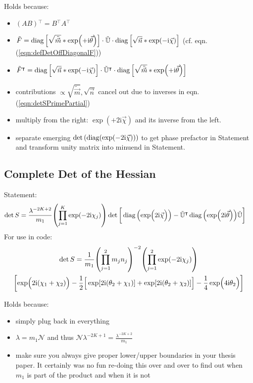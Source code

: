 \documentclass[
	english,
	a4paper,
	fontsize=10pt,
	parskip=half,
	titlepage=true,
	DIV=12,
	final
]{scrreprt}
\newcommand*{\transp}{\ensuremath{^\intercal}}
\newcommand*{\iunit}{\ensuremath{\mathrm{i}}}
\DeclareMathOperator{\diag}{diag}
\begin{document}
\newpage
Holds because:
\begin{itemize}
\item $(AB)\transp = B\transp A\transp$
\item $\tilde{F}
=
	\diag\qty[ \sqrt{ \tilde{\vec{m}}} * \exp(+\iunit \vec{\theta}) ]
	\cdot \tilde{\mathbb{U}} \cdot
	\diag\qty[ \sqrt{        \vec{n} } * \exp(-\iunit \vec{\chi  }) ]$
	(cf. eqn. (\ref{eqn:defDetOffDiagonalF}))
\item $\tilde{F}\transp
=
	\diag\qty[ \sqrt{        \vec{n} } * \exp(-\iunit \vec{\chi  }) ]
	\cdot \tilde{\mathbb{U}}\transp \cdot
	\diag\qty[ \sqrt{ \tilde{\vec{m}}} * \exp(+\iunit \vec{\theta}) ]$
\item contributions $\propto \sqrt{\tilde{\vec{m}}}, \sqrt{\vec{n}}$ cancel out due to inverses in eqn.
	(\ref{eqn:detSPrimePartial})
\item multiply from the right: $\exp(+2\iunit \vec{\chi})$ and its inverse from the left.
\item separate emerging $\det\qty(\diag(\exp(-2\iunit \vec{\chi})))$ to get phase prefactor in Statement and transform unity matrix into minuend in Statement.
\end{itemize}

\subsection{Complete Det of the Hessian}
Statement:
\begin{align}
	\det S
&=
	\frac{ \lambda^{-2K+2} }{ m_1 }
	\qty( \prod_{j=1}^{K} \exp(-2\iunit \chi_j) )
	\det\qty[\bigg.
		\diag\qty(\exp(\Big.2\iunit\vec{\chi}))
		-
		\tilde{\mathbb{U}}\transp
		\diag\qty(\exp(2\iunit\vec{\theta}))
		\tilde{\mathbb{U}}
	]
\label{eqn:detComplete}
\end{align}
For use in code:
\begin{multline*}
	\det S
=
	\frac{1}{m_1}
	\qty( \prod_{j=1}^{2} m_j n_j)^{-2}
	\qty( \prod_{j=1}^{2} \exp(-2\iunit \chi_j) )
\\
	\qty[
		\exp( \Big. 2\iunit (\chi_1 + \chi_2) )
		-\frac{1}{2} \qty[ \Big.
			\exp[2\iunit (\theta_2 + \chi_1)] +
			\exp[2\iunit (\theta_2 + \chi_2)]
		]
		-
		\frac{1}{4}\exp( \Big. 4\iunit \theta_2 )
	]
\end{multline*}

Holds because:
\begin{itemize}
\item simply plug back in everything
\item $\lambda = m_1 \mathcal{N}$ 
	and thus 
	$\mathcal{N} \lambda^{-2K+1} = \frac{ \lambda^{-2K+2} }{ m_1 }$
\item \color{red} make sure you always give proper lower/upper boundaries in your thesis paper. It certainly was no fun re-doing this over and over to find out when $m_1$ is part of the product and when it is not
\end{itemize}
\end{document}

